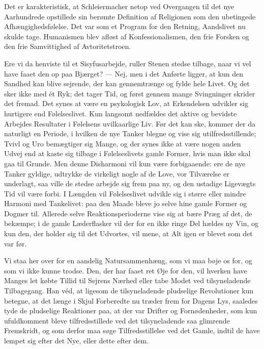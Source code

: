 \documentclass[12pt,a4paper]{article}
\newcommand{\apage}[1]{\marginnote{\footnotesize\textit{[#1]}}}
\begin{document}
Det er karakteristisk, at Schleiermacher netop ved Overgangen til det nye
Aarhundrede opstillede sin berømte Definition af Religionen som den ubetingede
Afhængighedsfølelse. Det var som et Program for den Retning, Aandslivet nu skulde
tage. Humanismen blev afløst af Konfessionalismen, den frie Forsken og den frie
Samvittighed af Avtoritetstroen.

Ere vi da henviste til et Sisyfusarbejde, ruller Stenen stedse tilbage, naar vi
vel have faaet den op paa Bjærget? --- Nej, men i det Anførte ligger, at kun den
Sandhed kan blive sejrende, der kan gennemtrænge og fylde hele Livet. Og det sker
ikke med ét Ryk; det tager Tid, og først gennem mange Svingninger skrider det
fremad. Det synes at være en psykologisk Lov, at Erkendelsen udvikler sig \apage{205}
hurtigere end Følelseslivet. Kun langsomt nedfældes det aktive og bevidste
Arbejdes Resultater i Følelsens uvilkaarlige Liv. Før det kan ske, kommer der da
naturligt en Periode, i hvilken de nye Tanker blegne og vise sig utilfredsstillende;
Tvivl og Uro bemægtiger sig Mange, og der synes ikke at være nogen anden Udvej end
at kaste sig tilbage i Følelseslivets gamle Former, hvis man ikke skal gaa til
Grunde. Men denne Disharmoni vil kun være forbigaaende: ere de nye Tanker gyldige,
udtrykke de virkeligt nogle af de Love, vor Tilværelse er underlagt, saa ville de
stedse arbejde sig frem paa ny, og den ustadige Ligevægts Tid vil være forbi. I
Længden vil Følelseslivet udvikle sig i større eller mindre Harmoni med Tankelivet:
paa den Maade bleve jo selve hine gamle Former og Dogmer til. Allerede selve
Reaktionsperioderne vise sig at bære Præg af det, de bekæmpe; i de gamle
Læderflasker vil der for en ikke ringe Del hældes ny Vin, og kun den, der holder
sig til det Udvortes, vil mene, at Alt igen er blevet som det var før.

Vi staa her over for en aandelig Natursammenhæng, som vi maa bøje os for, og som
vi ikke kunne trodse. Den, der har faaet ret Øje for den, vil hverken have Manges
let købte Tillid til Sejrens Nærhed eller tabe Modet ved tilsyneladende Tilbagegang.
Han véd, at ligesom de tilsyneladende pludselige Revolutioner kun betegne, at det
længe i Skjul Forberedte nu træder frem for Dagens Lys, saaledes tyde de pludselige
Reaktioner paa, at der var Drifter og Fornødenheder, som kun ufuldkomment bleve
tilfredsstillede ved det tilsyneladende saa glimrende Fremskridt, og som derfor maa
søge Tilfredsstillelse ved det Gamle, indtil de have lempet sig efter det Nye, eller
dette efter dem.
\end{document}
